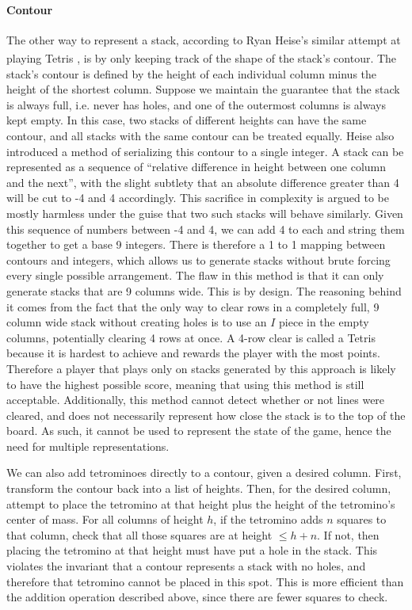 \documentclass[fontsize=12pt]{article}
\def\tetris{Tetris\textsuperscript{\textregistered}}
\begin{document}
\paragraph{Contour}
\label{par:contour}
The other way to represent a stack, according to Ryan Heise's similar attempt at playing \tetris{} \cite{bib:ryan_heise}, is by only keeping track of the shape of the stack's contour. The stack's contour is defined by the height of each individual column minus the height of the shortest column. Suppose we maintain the guarantee that the stack is always full, i.e. never has holes, and one of the outermost columns is always kept empty. In this case, two stacks of different heights can have the same contour, and all stacks with the same contour can be treated equally. Heise also introduced a method of serializing this contour to a single integer. A stack can be represented as a sequence of ``relative difference in height between one column and the next'', with the slight subtlety that an absolute difference greater than 4 will be cut to -4 and 4 accordingly. This sacrifice in complexity is argued to be mostly harmless under the guise that two such stacks will behave similarly. Given this sequence of numbers between -4 and 4, we can add 4 to each and string them together to get a base 9 integers. There is therefore a 1 to 1 mapping between contours and integers, which allows us to generate stacks without brute forcing every single possible arrangement. The flaw in this method is that it can only generate stacks that are 9 columns wide. This is by design. The reasoning behind it comes from the fact that the only way to clear rows in a completely full, 9 column wide stack without creating holes is to use an $I$ piece in the empty columns, potentially clearing 4 rows at once. A 4-row clear is called a Tetris because it is hardest to achieve and rewards the player with the most points. Therefore a player that plays only on stacks generated by this approach is likely to have the highest possible score, meaning that using this method is still acceptable. Additionally, this method cannot detect whether or not lines were cleared, and does not necessarily represent how close the stack is to the top of the board. As such, it cannot be used to represent the state of the game, hence the need for multiple representations.
\par We can also add tetrominoes directly to a contour, given a desired column. First, transform the contour back into a list of heights. Then, for the desired column, attempt to place the tetromino at that height plus the height of the tetromino's center of mass. For all columns of height $h$, if the tetromino adds $n$ squares to that column, check that all those squares are at height $\leq h + n$. If not, then placing the tetromino at that height must have put a hole in the stack. This violates the invariant that a contour represents a stack with no holes, and therefore that tetromino cannot be placed in this spot. This is more efficient than the addition operation described above, since there are fewer squares to check.
\end{document}
